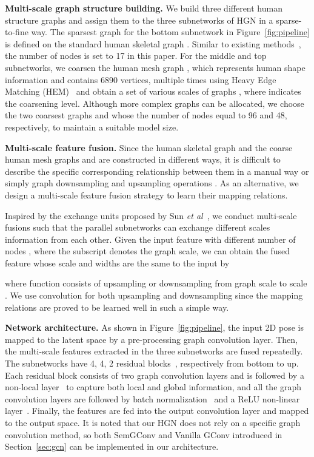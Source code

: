 \documentclass{bmvc2k}
\def\etal{\emph{et al}\bmvaOneDot}
\begin{document}
{\bf Multi-scale graph structure building.} We build three different human structure graphs and assign them to the three subnetworks of HGN in a sparse-to-fine way. The sparsest graph for the bottom subnetwork in Figure~\ref{fig:pipeline} is defined on the standard human skeletal graph . Similar to existing methods~\cite{2017simple,zou2020high,liu2020comprehensive}, the number of nodes  is set to 17 in this paper. For the middle and top subnetworks, we coarsen the human mesh graph , which represents human shape information and contains 6890 vertices, multiple times using Heavy Edge Matching (HEM)~\cite{defferrard2016convolutional} and obtain a set of various scales of graphs , where  indicates the coarsening level. Although more complex graphs can be allocated, we choose the two coarsest graphs  and  whose the number of nodes  equal to 96 and 48, respectively, to maintain a suitable model size.





{\bf Multi-scale feature fusion.} 
Since the human skeletal graph  and the coarse human mesh graphs  and  are constructed in different ways, it is difficult to describe the specific corresponding relationship between them in a manual way or simply graph downsampling and upsampling operations \cite{2019Exploiting,2021Graph}. As an alternative, we design a multi-scale feature fusion strategy to learn their mapping relations.

Inspired by the exchange units proposed by Sun \etal~\cite{sun2019hr}, we conduct multi-scale fusions  such that the  parallel subnetworks can exchange different scales information from each other. Given the input feature  with different number of nodes , where the subscript denotes the graph scale, we can obtain the fused feature  whose scale
and widths are the same to the input by

where function  
consists of upsampling or downsampling  from graph scale   to scale .  We use  convolution for both upsampling and downsampling since the mapping relations are proved to be learned well in such a simple way.



{\bf Network architecture.}
As shown in Figure~\ref{fig:pipeline}, the input 2D pose is mapped to the latent space by a pre-processing graph convolution layer. Then, the multi-scale features extracted in the three subnetworks are fused repeatedly. The subnetworks have 4, 4, 2 residual blocks~\cite{he2016deep}, respectively from bottom to up. Each residual block consists of two graph convolution layers and is followed by a non-local layer~\cite{wang2018non} to capture both local and global information, and all the graph convolution layers are followed by batch normalization~\cite{ioffe2015batch} and a ReLU non-linear layer~\cite{nair2010rectified}.  Finally, the features are fed into the output convolution layer and mapped to the output space. It is noted that our HGN does not rely on a specific graph convolution method, so both SemGConv and Vanilla GConv introduced in Section~\ref{sec:gcn} can be implemented in our architecture. 
\end{document}
